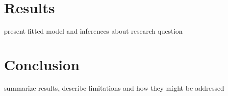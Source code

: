 \documentclass[12pt, twocolumn]{article}
\begin{document}
\section{Results}
present fitted model and inferences about research question



\section{Conclusion}
summarize results, describe limitations and how they might be addressed



\theendnotes
\end{document}
